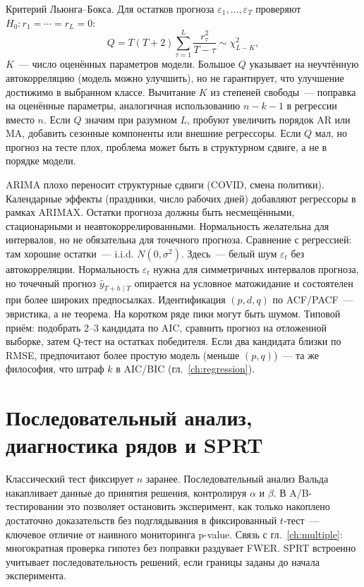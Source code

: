 Критерий Льюнга--Бокса. Для остатков прогноза $\varepsilon_1,\ldots,\varepsilon_T$ проверяют $H_0\colon r_1=\cdots=r_L=0$: \[ Q=T(T+2)\sum_{\tau=1}^L\frac{r_\tau^2}{T-\tau}\sim\chi^2_{L-K}, \] $K$~--- число оценённых параметров модели.
Большое $Q$ указывает на неучтённую автокорреляцию (модель можно улучшить), но не гарантирует, что улучшение достижимо в выбранном классе.
Вычитание $K$ из степеней свободы~--- поправка на оценённые параметры, аналогичная использованию $n-k-1$ в регрессии вместо $n$.
Если $Q$ значим при разумном $L$, пробуют увеличить порядок AR или MA, добавить сезонные компоненты или внешние регрессоры. Если $Q$ мал, но прогноз на тесте плох, проблема может быть в структурном сдвиге, а не в порядке модели.

ARIMA плохо переносит структурные сдвиги (COVID, смена политики).
Календарные эффекты (праздники, число рабочих дней) добавляют регрессоры в рамках ARIMAX.
Остатки прогноза должны быть несмещёнными, стационарными и неавтокоррелированными. Нормальность желательна для интервалов, но не обязательна для точечного прогноза.
Сравнение с регрессией: там хорошие остатки~--- i.i.d. $N(0,\sigma^2)$. Здесь~--- белый шум $\varepsilon_t$ без автокорреляции. Нормальность $\varepsilon_t$ нужна для симметричных интервалов прогноза, но точечный прогноз $\hat y_{T+h\mid T}$ опирается на условное матожидание и состоятелен при более широких предпосылках.
Идентификация $(p,d,q)$ по ACF/PACF~--- эвристика, а не теорема. На коротком ряде пики могут быть шумом. Типовой приём: подобрать 2--3 кандидата по AIC, сравнить прогноз на отложенной выборке, затем Q-тест на остатках победителя. Если два кандидата близки по RMSE, предпочитают более простую модель (меньше $(p,q)$)~--- та же философия, что штраф $k$ в AIC/BIC (гл.~\ref{ch:regression}).

\section{Последовательный анализ, диагностика рядов и SPRT}

Классический тест фиксирует $n$ заранее. Последовательный анализ Вальда накапливает данные до принятия решения, контролируя $\alpha$ и $\beta$.
В A/B-тестировании это позволяет остановить эксперимент, как только накоплено достаточно доказательств без подглядывания в фиксированный $t$-тест~--- ключевое отличие от наивного мониторинга p-value.
Связь с гл.~\ref{ch:multiple}: многократная проверка гипотез без поправки раздувает FWER. SPRT встроенно учитывает последовательность решений, если границы заданы до начала эксперимента.

